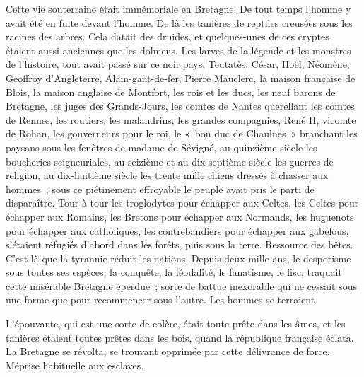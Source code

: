 \documentclass[french,twoside]{book} %
\begin{document}
Cette vie souterraine était immémoriale en Bretagne. De tout temps l’homme y avait été en fuite devant l’homme. De là les tanières de reptiles creusées sous les racines des arbres. Cela datait des druides, et quelques-unes de ces cryptes étaient aussi anciennes que les dolmens. Les larves de la légende et les monstres de l’histoire, tout avait passé sur ce noir pays, Teutatès, César, Hoël, Néomène, Geoffroy d’Angleterre, Alain-gant-de-fer, Pierre Mauclerc, la maison française de Blois, la maison anglaise de Montfort, les rois et les ducs, les neuf barons de Bretagne, les juges des Grands-Jours, les comtes de Nantes querellant les comtes de Rennes, les routiers, les malandrins, les grandes compagnies, René II, vicomte de Rohan, les gouverneurs pour le roi, le « bon duc de Chaulnes » branchant les paysans sous les fenêtres de madame de Sévigné, au quinzième siècle les boucheries seigneuriales, au seizième et au dix-septième siècle les guerres de religion, au dix-huitième siècle les trente mille chiens dressés à chasser aux hommes ; sous ce piétinement effroyable le peuple avait pris le parti de disparaître. Tour à tour les troglodytes pour échapper aux Celtes, les Celtes pour échapper aux Romains, les Bretons pour échapper aux Normands, les huguenots pour échapper aux catholiques, les contrebandiers  pour échapper aux gabelous, s’étaient réfugiés d’abord dans les forêts, puis sous la terre. Ressource des bêtes. C’est là que la tyrannie réduit les nations. Depuis deux mille ans, le despotisme sous toutes ses espèces, la conquête, la féodalité, le fanatisme, le fisc, traquait cette misérable Bretagne éperdue ; sorte de battue inexorable qui ne cessait sous une forme que pour recommencer sous l’autre. Les hommes se terraient.\par
L’épouvante, qui est une sorte de colère, était toute prête dans les âmes, et les tanières étaient toutes prêtes dans les bois, quand la république française éclata. La Bretagne se révolta, se trouvant opprimée par cette délivrance de force. Méprise habituelle aux esclaves.
\end{document}
